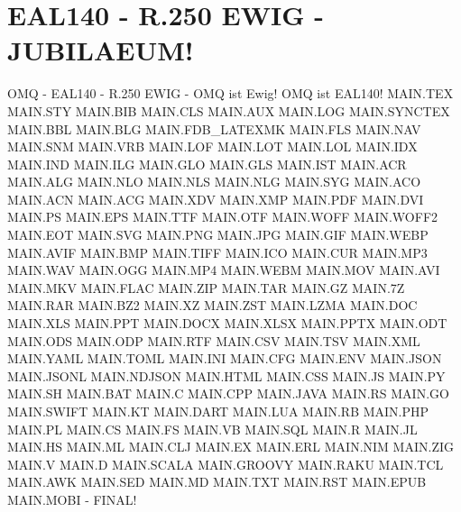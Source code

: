 \documentclass{MAIN}
\begin{document}
\section*{EAL140 - R.250 EWIG - JUBILAEUM!}
OMQ - EAL140 - R.250 EWIG - OMQ ist Ewig! OMQ ist EAL140!
MAIN.TEX MAIN.STY MAIN.BIB MAIN.CLS MAIN.AUX MAIN.LOG MAIN.SYNCTEX MAIN.BBL MAIN.BLG MAIN.FDB_LATEXMK MAIN.FLS MAIN.NAV MAIN.SNM MAIN.VRB MAIN.LOF MAIN.LOT MAIN.LOL MAIN.IDX MAIN.IND MAIN.ILG MAIN.GLO MAIN.GLS MAIN.IST MAIN.ACR MAIN.ALG MAIN.NLO MAIN.NLS MAIN.NLG MAIN.SYG MAIN.ACO MAIN.ACN MAIN.ACG MAIN.XDV MAIN.XMP MAIN.PDF MAIN.DVI MAIN.PS MAIN.EPS MAIN.TTF MAIN.OTF MAIN.WOFF MAIN.WOFF2 MAIN.EOT MAIN.SVG MAIN.PNG MAIN.JPG MAIN.GIF MAIN.WEBP MAIN.AVIF MAIN.BMP MAIN.TIFF MAIN.ICO MAIN.CUR MAIN.MP3 MAIN.WAV MAIN.OGG MAIN.MP4 MAIN.WEBM MAIN.MOV MAIN.AVI MAIN.MKV MAIN.FLAC MAIN.ZIP MAIN.TAR MAIN.GZ MAIN.7Z MAIN.RAR MAIN.BZ2 MAIN.XZ MAIN.ZST MAIN.LZMA MAIN.DOC MAIN.XLS MAIN.PPT MAIN.DOCX MAIN.XLSX MAIN.PPTX MAIN.ODT MAIN.ODS MAIN.ODP MAIN.RTF MAIN.CSV MAIN.TSV MAIN.XML MAIN.YAML MAIN.TOML MAIN.INI MAIN.CFG MAIN.ENV MAIN.JSON MAIN.JSONL MAIN.NDJSON MAIN.HTML MAIN.CSS MAIN.JS MAIN.PY MAIN.SH MAIN.BAT MAIN.C MAIN.CPP MAIN.JAVA MAIN.RS MAIN.GO MAIN.SWIFT MAIN.KT MAIN.DART MAIN.LUA MAIN.RB MAIN.PHP MAIN.PL MAIN.CS MAIN.FS MAIN.VB MAIN.SQL MAIN.R MAIN.JL MAIN.HS MAIN.ML MAIN.CLJ MAIN.EX MAIN.ERL MAIN.NIM MAIN.ZIG MAIN.V MAIN.D MAIN.SCALA MAIN.GROOVY MAIN.RAKU MAIN.TCL MAIN.AWK MAIN.SED MAIN.MD MAIN.TXT MAIN.RST MAIN.EPUB MAIN.MOBI - FINAL!
\end{document}
